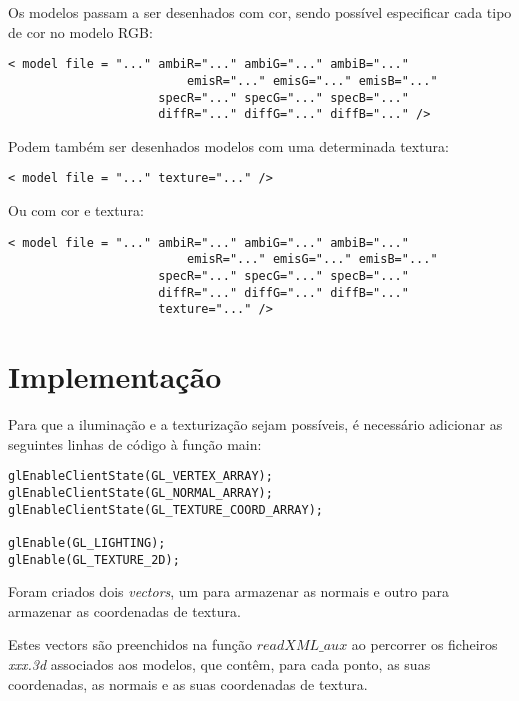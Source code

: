 \documentclass[11pt,a4paper]{report}
\begin{document}
\iffalse 
Para todos os tipos de luzes enunciados a cima podem especificar a intensidade RGB das luzes no que toca à componente difusa, ambiente e especular, assim:
\begin{lstlisting}[style = xml]
<light ... ambiR="..." ambiG="..." ambiB="..."
           specR="..." specG="..." specB="..."
     diffR="..." diffG="..." diffB="..." />
\end{lstlisting}
\fi

Os modelos passam a ser desenhados com cor, sendo possível especificar cada tipo de cor no modelo RGB:
\begin{lstlisting}[style = xml]
< model file = "..." ambiR="..." ambiG="..." ambiB="..."
		                 emisR="..." emisG="..." emisB="..."
                     specR="..." specG="..." specB="..."
                     diffR="..." diffG="..." diffB="..." />
\end{lstlisting}

Podem também ser desenhados modelos com uma determinada textura:
\begin{lstlisting}[style = xml]
< model file = "..." texture="..." />
\end{lstlisting}

Ou com cor e textura:
\begin{lstlisting}[style = xml]
< model file = "..." ambiR="..." ambiG="..." ambiB="..."
		                 emisR="..." emisG="..." emisB="..."
                     specR="..." specG="..." specB="..."
                     diffR="..." diffG="..." diffB="..."
                     texture="..." />
\end{lstlisting}

\section{Implementação}
Para que a iluminação e a texturização sejam possíveis, é necessário adicionar as seguintes linhas de código à função main:

\begin{lstlisting}[style = code]
glEnableClientState(GL_VERTEX_ARRAY);
glEnableClientState(GL_NORMAL_ARRAY);
glEnableClientState(GL_TEXTURE_COORD_ARRAY);

glEnable(GL_LIGHTING);
glEnable(GL_TEXTURE_2D);
\end{lstlisting}

Foram criados dois \emph{vectors}, um para armazenar as normais e outro para armazenar as coordenadas de textura.

Estes vectors são preenchidos na função {$readXML\_aux$} ao percorrer os ficheiros \emph{xxx.3d} associados aos modelos, que contêm, para cada ponto, as suas coordenadas, as normais e as suas coordenadas de textura.
\end{document}
